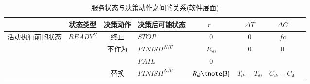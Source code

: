 \begin{table}[htbp]
    \caption{服务状态与决策动作之间的关系(软件层面)}
    \vspace{-0.5em}\label{table:state_action}\centering{}
    \begin{threeparttable}
        \begin{tabular}{llllllll}
            \toprule
            \multicolumn{1}{|c|}{} 
            & \multicolumn{1}{c}{状态类型\tnote{1}} 
            & \multicolumn{1}{|c}{{决策动作}} 
            & \multicolumn{1}{|c}{决策后可能状态\tnote{1}} 
            & \multicolumn{1}{|c}{$r$~\tnote{2}} 
            & \multicolumn{1}{|c}{$\Delta T$} 
            & \multicolumn{1}{|c|}{$\Delta C$} \\
            \hline
            
            \multicolumn{1}{|c|}{\multirow{9}{*}{\parbox{1em}{活动执行前的状态}}} 
            & \multirow{7}{*}{$READY^U$} 
            & \multicolumn{1}{|c}{{终止}} 
            & \multicolumn{1}{|l}{$STOP$} 
            & \multicolumn{1}{|c}{0} 
            & \multicolumn{1}{|c}{0} 
            & \multicolumn{1}{|c|}{$fc$} \\
            \cline{3-7}
            
            \multicolumn{1}{|c|}{} 
            &       
            & \multicolumn{1}{|c}{\multirow{2}{*}{{不作为}}} 
            & \multicolumn{1}{|l}{$FINISH^{N/U}$} 
            & \multicolumn{1}{|c}{$R_{i0}$} 
            & \multicolumn{1}{|c}{\multirow{2}{*}{0}} 
            & \multicolumn{1}{|c|}{\multirow{2}{*}{0}} \\
            
            \multicolumn{1}{|c|}{} 
            &       
            & \multicolumn{1}{|c}{} 
            & \multicolumn{1}{|l}{$FAIL$} 
            & \multicolumn{1}{|c}{0}
            & \multicolumn{1}{|c}{} 
            & \multicolumn{1}{|c|}{} \\
            \cline{3-7}
            
            \multicolumn{1}{|c|}{} 
            &       
            & \multicolumn{1}{|c}{\multirow{2}{*}{替换}} 
            & \multicolumn{1}{|l}{$FINISH^{N/U}$} 
            & \multicolumn{1}{|c}{$R_{ik}\tnote{3}$} 
            & \multicolumn{1}{|c}{\multirow{2}{*}{$T_{ik}-T_{i0}$}} 
            & \multicolumn{1}{|c|}{\multirow{2}{*}{$C_{ik}-C_{i0}$}} \\
            

\end{tabular}
\end{threeparttable}
\end{table}
